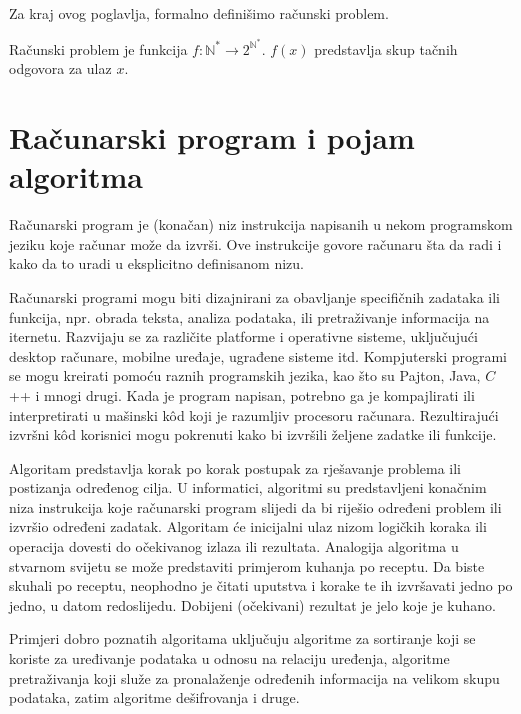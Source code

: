 Za kraj ovog poglavlja, formalno definišimo računski problem.

\begin{definition}
	Računski problem je funkcija $f \colon \mathbb{N}^* \rightarrow 2^{\mathbb{N}^*}$. $f (x)$ predstavlja skup tačnih odgovora  za ulaz $x$.
\end{definition} 
 
\section{Računarski program i pojam algoritma}

Računarski program je (konačan) niz instrukcija napisanih u nekom programskom jeziku koje računar  može da izvrši. Ove instrukcije govore računaru šta da radi i kako da to uradi u eksplicitno definisanom nizu.

Računarski programi mogu biti dizajnirani za obavljanje specifičnih zadataka ili funkcija,  npr. obrada teksta, analiza podataka,  ili pretraživanje informacija na iternetu.  Razvijaju se za različite platforme i operativne sisteme, uključujući desktop računare, mobilne uređaje, ugrađene sisteme itd.  Kompjuterski programi se mogu kreirati pomoću raznih programskih jezika, kao što su Pajton, Java, $C$++  i mnogi drugi. Kada je program napisan, potrebno ga je kompajlirati ili interpretirati u mašinski k\^od koji je razumljiv procesoru računara. Rezultirajući izvršni k\^od korisnici mogu pokrenuti kako bi izvršili željene zadatke ili funkcije.

Algoritam predstavlja  korak po korak postupak za rješavanje problema ili postizanja određenog   cilja. U informatici, algoritmi su predstavljeni konačnim  niza instrukcija koje računarski program slijedi da bi riješio određeni problem ili izvršio određeni zadatak. Algoritam će inicijalni ulaz nizom logičkih koraka ili operacija dovesti do očekivanog izlaza ili rezultata.  Analogija algoritma u stvarnom svijetu se može predstaviti primjerom kuhanja po receptu. Da biste skuhali po receptu, neophodno je čitati uputstva i korake te ih izvršavati jedno po jedno, u datom redoslijedu. Dobijeni (očekivani) rezultat je jelo koje je kuhano.  

 Primjeri dobro poznatih algoritama uključuju algoritme za sortiranje koji se koriste za uređivanje podataka u odnosu na relaciju  uređenja, algoritme pretraživanja koji služe za pronalaženje određenih informacija na velikom skupu podataka, zatim algoritme dešifrovanja i druge.  %

